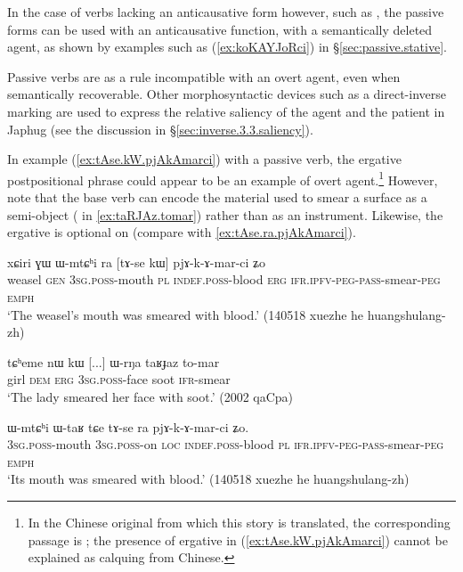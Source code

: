 In the case of verbs lacking an anticausative form however, such as  , the passive forms can be used with an anticausative function, with a semantically deleted agent, as shown by examples such as (\ref{ex:koKAYJoRci}) in §\ref{sec:passive.stative}.

Passive verbs are as a rule incompatible with an overt agent, even when semantically recoverable. Other morphosyntactic devices such as a direct-inverse marking are used to express the relative saliency of the agent and the patient in Japhug (see the discussion in §\ref{sec:inverse.3.3.saliency}).

In example (\ref{ex:tAse.kW.pjAkAmarci}) with a passive verb, the ergative postpositional phrase  could appear to be an example of overt agent.\footnote{In the Chinese original from which this story is translated, the corresponding passage is ; the presence of ergative in (\ref{ex:tAse.kW.pjAkAmarci}) cannot be explained as calquing from Chinese. } However, note that the base verb  can encode the material used to smear a surface as a semi-object ( in \ref{ex:taRJAz.tomar}) rather than as an instrument. Likewise, the ergative is optional on  (compare with \ref{ex:tAse.ra.pjAkAmarci}).

\begin{exe}
\ex \label{ex:tAse.kW.pjAkAmarci}
 \gll xɕiri ɣɯ ɯ-mtɕʰi ra [tɤ-se kɯ] pjɤ-k-ɤ-mar-ci ʑo \\
 weasel \textsc{gen} \textsc{3sg}.\textsc{poss}-mouth \textsc{pl} \textsc{indef}.\textsc{poss}-blood \textsc{erg} \textsc{ifr}.\textsc{ipfv}-\textsc{peg}-\textsc{pass}-smear-\textsc{peg} \textsc{emph} \\
\glt  `The weasel's mouth was smeared with blood.' (140518 xuezhe he huangshulang-zh)
\end{exe}

\begin{exe}
\ex \label{ex:taRJAz.tomar}
 \gll tɕʰeme nɯ kɯ  [...] ɯ-rŋa taʁɟaz to-mar \\
 girl \textsc{dem} \textsc{erg} { } \textsc{3sg}.\textsc{poss}-face soot \textsc{ifr}-smear \\
 \glt `The lady smeared her face with soot.' (2002 qaCpa)
\end{exe}

\begin{exe}
\ex \label{ex:tAse.ra.pjAkAmarci}
 \gll  ɯ-mtɕʰi ɯ-taʁ tɕe tɤ-se ra pjɤ-k-ɤ-mar-ci ʑo. \\
 \textsc{3sg}.\textsc{poss}-mouth \textsc{3sg}.\textsc{poss}-on \textsc{loc} \textsc{indef}.\textsc{poss}-blood \textsc{pl} \textsc{ifr}.\textsc{ipfv}-\textsc{peg}-\textsc{pass}-smear-\textsc{peg} \textsc{emph} \\
\glt  `Its mouth was smeared with blood.' (140518 xuezhe he huangshulang-zh) 
\end{exe}

